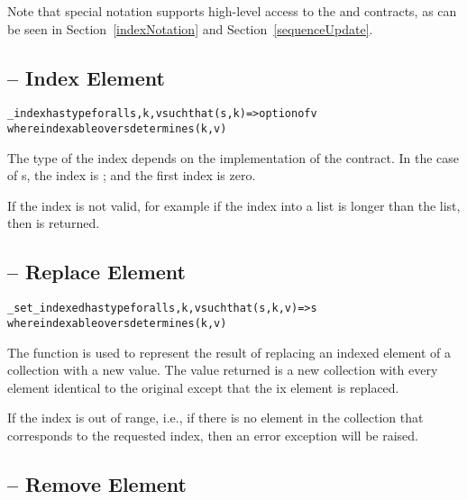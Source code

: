 \begin{aside}
Note that special notation supports high-level access to the  and  contracts, as can be seen in Section~\vref{indexNotation} and Section~\vref{sequenceUpdate}.
\end{aside}

\subsection{ -- Index Element}
\label{indexFunction}
\begin{alltt}
_index has type for all s,k,v such that (s,k)=>option of v
                where indexable over s determines (k,v)
\end{alltt}
\begin{aside}
The type of the index depends on the implementation of the contract. In the case of s, the index is ; and the first index is zero.
\end{aside}
\begin{aside}
If the index is not valid, for example if the index into a list is longer than the list, then  is returned.
\end{aside}

\subsection{ -- Replace Element}
\label{indexReplaceFunction}
\begin{alltt}
\_set\_indexed has type for all s,k,v such that (s,k,v)=>s
                        where indexable over s determines (k,v)
\end{alltt}
The  function is used to represent the result of replacing an indexed element of a collection with a new value. The value returned is a new collection with every element identical to the original except that the ix element is replaced.

If the index is out of range, i.e., if there is no element in the collection that corresponds to the requested index, then an error exception will be raised.

\subsection{ -- Remove Element}
\label{indexDeleteFunction}

